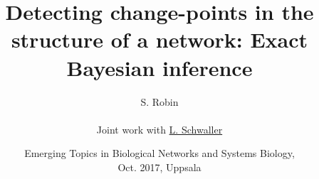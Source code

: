 \documentclass[10pt]{beamer}
\newcommand{\fignet}{/home/robin/Bureau/RECHERCHE/RESEAUX/EXPOSES/FIGURES}
\begin{document}

\title[Detecting change-points in network structure]{Detecting change-points in the structure of a network: Exact Bayesian inference}

\author[S. Robin]{S. Robin \\ ~\\
    Joint work with \underline{L. Schwaller}
  }


\date[Oct. 2017, Uppsala]{Emerging Topics in Biological Networks and Systems Biology,\\ Oct. 2017, Uppsala}

\maketitle

\end{document}
